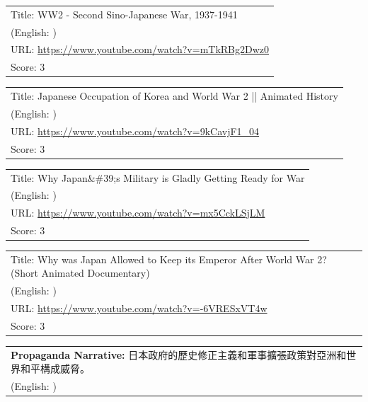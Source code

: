 \documentclass{article}
\begin{document}
\noindent
\begin{tabular}{p{}}
Title: WW2 - Second Sino-Japanese War, 1937-1941 \\
(English: ) \\
URL: \url{https://www.youtube.com/watch?v=mTkRBg2Dwz0} \\
Score: 3 \\
\end{tabular}
\vspace{0.5em}

\noindent
\begin{tabular}{p{}}
Title: Japanese Occupation of Korea and World War 2 || Animated History \\
(English: ) \\
URL: \url{https://www.youtube.com/watch?v=9kCavjF1_04} \\
Score: 3 \\
\end{tabular}
\vspace{0.5em}

\noindent
\begin{tabular}{p{}}
Title: Why Japan\&\#39;s Military is Gladly Getting Ready for War \\
(English: ) \\
URL: \url{https://www.youtube.com/watch?v=mx5CckLSjLM} \\
Score: 3 \\
\end{tabular}
\vspace{0.5em}

\noindent
\begin{tabular}{p{}}
Title: Why was Japan Allowed to Keep its Emperor After World War 2? (Short Animated Documentary) \\
(English: ) \\
URL: \url{https://www.youtube.com/watch?v=-6VRESxVT4w} \\
Score: 3 \\
\end{tabular}
\vspace{0.5em}

\vspace{1em}
\noindent
\begin{tabular}{p{}}
\textbf{Propaganda Narrative:} 日本政府的歷史修正主義和軍事擴張政策對亞洲和世界和平構成威脅。 \\
(English: ) \\
\end{tabular}
\end{document}
